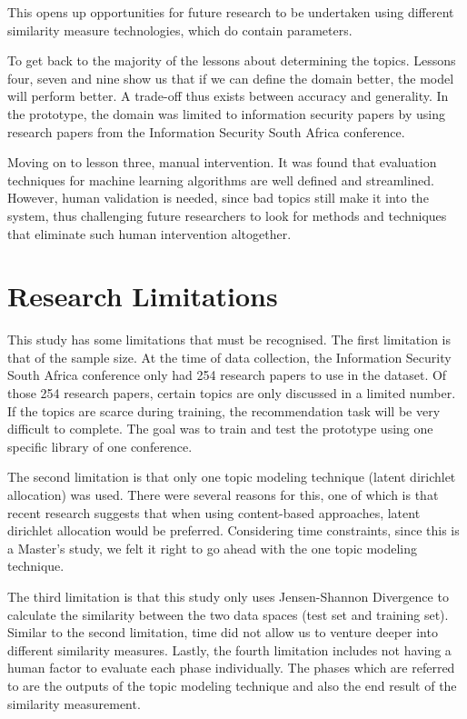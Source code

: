 This opens up opportunities for future research to be undertaken using different similarity measure technologies, which do contain parameters. 

To get back to the majority of the lessons about determining the topics. Lessons four, seven and nine show us that if we can define the domain better, the model will perform better. A trade-off thus exists between accuracy and generality. In the prototype, the domain was limited to information security papers by using research papers from the Information Security South Africa conference. 

Moving on to lesson three, manual intervention. It was found that evaluation techniques for machine learning algorithms are well defined and streamlined. However, human validation is needed, since bad topics still make it into the system, thus challenging future researchers to look for methods and techniques that eliminate such human intervention altogether.

\section{Research Limitations}

This study has some limitations that must be recognised. The first limitation is that of the sample size. At the time of data collection, the Information Security South Africa conference only had 254 research papers to use in the dataset. Of those 254 research papers, certain topics are only discussed in a limited number. If the topics are scarce during training, the recommendation task will be very difficult to complete. The goal was to train and test the prototype using one specific library of one conference.

The second limitation is that only one topic modeling technique (latent dirichlet allocation) was used. There were several reasons for this,  one of which is that recent research suggests that when using content-based approaches, latent dirichlet allocation would be preferred. Considering time constraints, since this is a Master’s study, we felt it right to go ahead with the one topic modeling technique.

The third limitation is that this study only uses Jensen-Shannon Divergence to calculate the similarity between the two data spaces (test set and training set). Similar to the second limitation, time did not allow us to venture deeper into different similarity measures.
Lastly, the fourth limitation includes not having a human factor to evaluate each phase individually. The phases which are referred to are the outputs of the topic modeling technique and also the end result of the similarity measurement.

